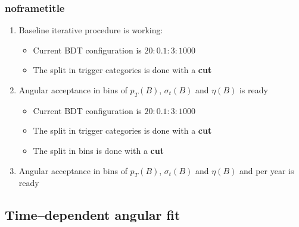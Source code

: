\documentclass[aspectratio=43]{beamer}
\begin{document}
\begin{frame}[default] %
\frametitle{noframetitle}

\begin{enumerate}
  \item Baseline iterative procedure is working:
  \begin{itemize}
    \item Current BDT configuration is $20:0.1:3:1000$
    \item The split in trigger categories is done with a \textbf{cut}
  \end{itemize}
  \item Angular acceptance in bins of $p_T(B)$, $\sigma_t(B)$ and $\eta(B)$ is ready
  \begin{itemize}
    \item Current BDT configuration is $20:0.1:3:1000$
    \item The split in trigger categories is done with a \textbf{cut}
    \item The split in bins is done with a \textbf{cut}
  \end{itemize}
  \item Angular acceptance in bins of $p_T(B)$, $\sigma_t(B)$ and $\eta(B)$ and per year is ready

\end{enumerate}

\end{frame} %








\subsection{Time--dependent angular fit}
\end{document}
